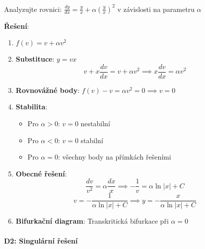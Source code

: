 \begin{example}
Analyzujte rovnici: $\frac{dy}{dx} = \frac{y}{x} + \alpha\left(\frac{y}{x}\right)^2$ v závislosti na parametru $\alpha$
\vspace{0.3\baselineskip}

\textbf{Řešení}: 
\begin{enumerate}
\item $f(v) = v + \alpha v^2$

\item \textbf{Substituce}: $y = vx$
\[
v + x\frac{dv}{dx} = v + \alpha v^2 \implies x\frac{dv}{dx} = \alpha v^2
\]

\item \textbf{Rovnovážné body}: $f(v) - v = \alpha v^2 = 0 \implies v = 0$

\item \textbf{Stabilita}: 
\begin{itemize}
\item Pro $\alpha > 0$: $v = 0$ nestabilní
\item Pro $\alpha < 0$: $v = 0$ stabilní
\item Pro $\alpha = 0$: všechny body na přímkách řešeními
\end{itemize}

\item \textbf{Obecné řešení}:
\[
\frac{dv}{v^2} = \alpha\frac{dx}{x} \implies -\frac{1}{v} = \alpha\ln|x| + C
\]
\[
v = -\frac{1}{\alpha\ln|x| + C} \implies y = -\frac{x}{\alpha\ln|x| + C}
\]

\item \textbf{Bifurkační diagram}: Transkritická bifurkace při $\alpha = 0$
\end{enumerate}
\end{example}

\vspace{0.8\baselineskip}

\paragraph*{D2: Singulární řešení}

